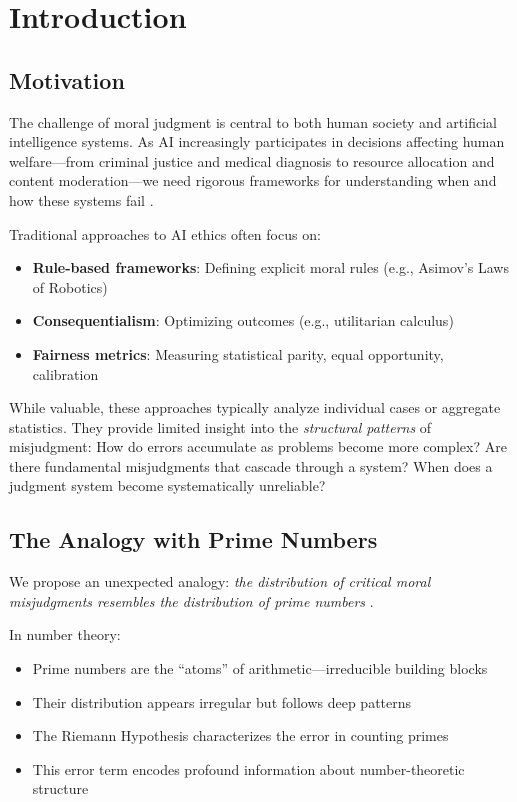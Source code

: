 \documentclass[12pt,a4paper]{article}
\theoremstyle{definition}
\theoremstyle{remark}
\begin{document}
\section{Introduction}
\label{sec:introduction}

\subsection{Motivation}

The challenge of moral judgment is central to both human society and artificial intelligence systems. As AI increasingly participates in decisions affecting human welfare---from criminal justice and medical diagnosis to resource allocation and content moderation---we need rigorous frameworks for understanding when and how these systems fail \citep{jobin2019,floridi2018}.

Traditional approaches to AI ethics often focus on:
\begin{itemize}
    \item \textbf{Rule-based frameworks}: Defining explicit moral rules (e.g., Asimov's Laws of Robotics)
    \item \textbf{Consequentialism}: Optimizing outcomes (e.g., utilitarian calculus)
    \item \textbf{Fairness metrics}: Measuring statistical parity, equal opportunity, calibration \citep{hardt2016,dwork2012}
\end{itemize}

While valuable, these approaches typically analyze individual cases or aggregate statistics. They provide limited insight into the \emph{structural patterns} of misjudgment: How do errors accumulate as problems become more complex? Are there fundamental misjudgments that cascade through a system? When does a judgment system become systematically unreliable?

\subsection{The Analogy with Prime Numbers}

We propose an unexpected analogy: \emph{the distribution of critical moral misjudgments resembles the distribution of prime numbers} \citep{riemann1859,edwards1974}.

In number theory:
\begin{itemize}
    \item Prime numbers are the ``atoms'' of arithmetic---irreducible building blocks
    \item Their distribution appears irregular but follows deep patterns
    \item The Riemann Hypothesis characterizes the error in counting primes
    \item This error term encodes profound information about number-theoretic structure
\end{itemize}
\end{document}
